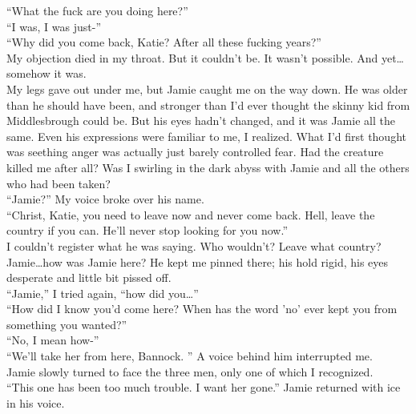 \documentclass[a5paper]{scrartcl}
\begin{document}
\enquote{What the fuck are you doing here?}\\


\enquote{I was, I was just-}\\


\enquote{Why did you come back, Katie? After all these fucking years?}\\


My objection died in my throat. But it couldn't be. It wasn't possible. And yet\dots somehow it was.\\


My legs gave out under me, but Jamie caught me on the way down. He was older than he should have been, and stronger than I'd ever thought the skinny kid from Middlesbrough could be. But his eyes hadn't changed, and it was Jamie all the same. Even his expressions were familiar to me, I realized. What I'd first thought was seething anger was actually just barely controlled fear. Had the creature killed me after all? Was I swirling in the dark abyss with Jamie and all the others who had been taken?\\


\enquote{Jamie?} My voice broke over his name.\\


\enquote{Christ, Katie, you need to leave now and never come back. Hell, leave the country if you can. He'll never stop looking for you now.}\\


I couldn't register what he was saying. Who wouldn't? Leave what country? Jamie\dots how was Jamie here? He kept me pinned there; his hold rigid, his eyes desperate and little bit pissed off.\\


\enquote{Jamie,} I tried again, \enquote{how did you\dots }\\


\enquote{How did I know you'd come here? When has the word 'no' ever kept you from something you wanted?}\\


\enquote{No, I mean how-}\\


\enquote{We'll take her from here, Bannock. } A voice behind him interrupted me. \\


Jamie slowly turned to face the three men, only one of which I recognized.\\


\enquote{This one has been too much trouble. I want her gone.} Jamie returned with ice in his voice.\\
\end{document}
